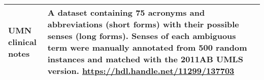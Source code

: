 \begin{table}[!tb]
\begin{tabular}{E{0.30\textwidth}p{0.62\textwidth}}
\midrule

UMN clinical notes\newline
{}\newline
{}\newline
{}
&
A dataset containing 75 acronyms and abbreviations (short forms) with their possible senses (long forms). Senses of each ambiguous term were manually annotated from 500 random instances and matched with the 2011AB UMLS version.\newline
{\minorfootnotesize\url{https://hdl.handle.net/11299/137703}}
\\

\bottomrule

\end{tabular}
\end{table}
\endgroup
